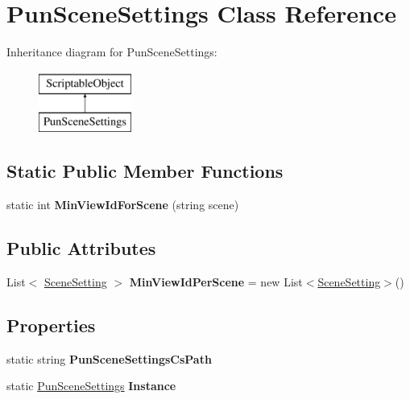 \hypertarget{class_pun_scene_settings}{}\section{Pun\+Scene\+Settings Class Reference}
\label{class_pun_scene_settings}
Inheritance diagram for Pun\+Scene\+Settings\+:\begin{figure}[H]
\begin{center}
\leavevmode
\includegraphics[height=2.000000cm]{class_pun_scene_settings}
\end{center}
\end{figure}
\subsection*{Static Public Member Functions}
\begin{DoxyCompactItemize}
\item 
static int {\bfseries Min\+View\+Id\+For\+Scene} (string scene)\hypertarget{class_pun_scene_settings_aa5344480f6e9b7ce76a2e9c235f630ed}{}\label{class_pun_scene_settings_aa5344480f6e9b7ce76a2e9c235f630ed}

\end{DoxyCompactItemize}
\subsection*{Public Attributes}
\begin{DoxyCompactItemize}
\item 
List$<$ \hyperlink{class_scene_setting}{Scene\+Setting} $>$ {\bfseries Min\+View\+Id\+Per\+Scene} = new List$<$\hyperlink{class_scene_setting}{Scene\+Setting}$>$()\hypertarget{class_pun_scene_settings_a827df7e0b56751a37d18179786954462}{}\label{class_pun_scene_settings_a827df7e0b56751a37d18179786954462}

\end{DoxyCompactItemize}
\subsection*{Properties}
\begin{DoxyCompactItemize}
\item 
static string {\bfseries Pun\+Scene\+Settings\+Cs\+Path}\hypertarget{class_pun_scene_settings_a96a96fc88a6e8b6919d04f833b7e0cb3}{}\label{class_pun_scene_settings_a96a96fc88a6e8b6919d04f833b7e0cb3}

\item 
static \hyperlink{class_pun_scene_settings}{Pun\+Scene\+Settings} {\bfseries Instance}\hypertarget{class_pun_scene_settings_a50bf111c9a9fd6daa6c4ab9082004932}{}\label{class_pun_scene_settings_a50bf111c9a9fd6daa6c4ab9082004932}

\end{DoxyCompactItemize}


